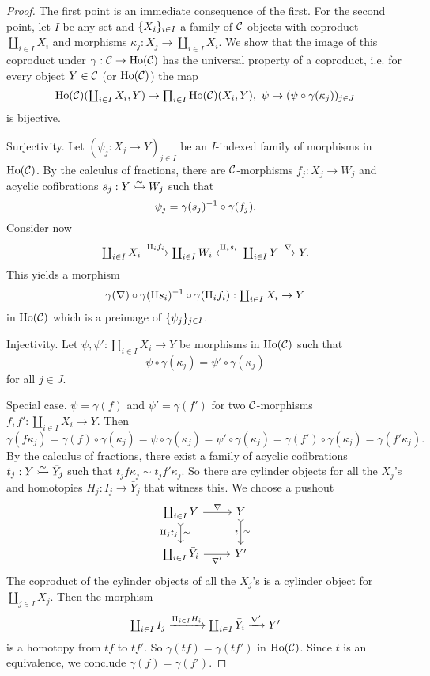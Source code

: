 \begin{proof}
The first point is an immediate consequence of the first. For the second point, let $I$ be any set and $\{X_i\}_{i\in I}$ a family of $\mathcal{C}$-objects with coproduct $\coprod_{i\in I}X_i$ and morphisms $\kappa_j:X_j\to\coprod_{i\in I}X_i$. We show that the image of this coproduct under $\gamma:\mathcal{C}\to\operatorname{Ho}(\mathcal{C})$ has the universal property of a coproduct, i.e. for every object $Y\in\mathcal{C}$ (or $\operatorname{Ho}(\mathcal{C})$) the map
\begin{align*}
    \textstyle\operatorname{Ho}(\mathcal{C})(\coprod_{i\in I}X_i,Y)\to\textstyle\prod_{i\in I}\operatorname{Ho}(\mathcal{C})(X_i,Y),\ \psi\mapsto (\psi\circ\gamma(\kappa_j))_{j\in J}
\end{align*}
is bijective.

Surjectivity. Let $(\psi_j:X_j\to Y)_{j\in I}$ be an $I$-indexed family of morphisms in $\operatorname{Ho}(\mathcal{C})$. By the calculus of fractions, there are $\mathcal{C}$-morphisms $f_j:X_j\to W_j$ and acyclic cofibrations $s_j:Y\acco W_j$ such that
\[\psi_j=\gamma(s_j)^{-1}\circ\gamma(f_j).\]
Consider now
\[\textstyle\coprod_{i\in I}X_i\xrightarrow{\amalg_i f_i}\coprod_{i\in I} W_i\xleftarrow{\amalg_i s_i}\coprod_{i\in I}Y\xrightarrow{\nabla}Y.\]
This yields a morphism
\[\gamma(\nabla)\circ\gamma(\amalg s_i)^{-1}\circ\gamma(\amalg_i f_i):\textstyle\coprod_{i\in I}X_i\to Y\]
in $\operatorname{Ho}(\mathcal{C})$ which is a preimage of $\{\psi_j\}_{j\in I}$.

Injectivity. Let $\psi,\psi':\coprod_{i\in I}X_i\to Y$ be morphisms in $\operatorname{Ho}(\mathcal{C})$ such that
\[\psi\circ\gamma(\kappa_j)=\psi'\circ\gamma(\kappa_j)\]
for all $j\in J$.

Special case. $\psi=\gamma(f)$ and $\psi'=\gamma(f')$ for two $\mathcal{C}$-morphisms $f,f':\coprod_{i\in I}X_i\to Y$. Then
\[\gamma(f\kappa_j)=\gamma(f)\circ\gamma(\kappa_j)=\psi\circ\gamma(\kappa_j)=\psi'\circ\gamma(\kappa_j)=\gamma(f')\circ\gamma(\kappa_j)=\gamma(f'\kappa_j).\]
By the calculus of fractions, there exist a family of acyclic cofibrations $t_j:Y\acco\bar Y_j$ such that $t_jf\kappa_j\sim t_j f'\kappa_j$. So there are cylinder objects for all the $X_j$'s and homotopies $H_j:I_j\to\bar Y_j$ that witness this. We choose a pushout
\[
\begin{tikzcd}
\coprod_{i\in I} Y \ar[d,tail,"\amalg_j t_j"',"\sim"] \ar[r,"\nabla"] & Y \ar[d,tail,"t"',"\sim"]\\
\coprod_{i\in I}\bar Y_i \ar[r,"\nabla'"'] & Y'
\end{tikzcd}
\]
The coproduct of the cylinder objects of all the $X_j$'s is a cylinder object for $\coprod_{j\in I}X_j$. Then the morphism
\[\textstyle\coprod_{i\in I}I_j\xrightarrow{\amalg_{i\in I} H_i}\textstyle\coprod_{i\in I}\bar Y_i\xrightarrow{\nabla'}Y'\]
is a homotopy from $tf$ to $tf'$. So $\gamma(tf)=\gamma(tf')$ in $\operatorname{Ho}(\mathcal{C})$. Since $t$ is an equivalence, we conclude $\gamma(f)=\gamma(f')$.


\end{proof}
